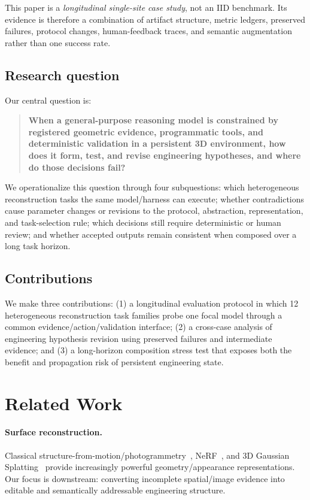 \documentclass[10pt]{article}
\begin{document}
This paper is a \emph{longitudinal single-site case study}, not an IID benchmark. Its evidence is therefore a combination of artifact structure, metric ledgers, preserved failures, protocol changes, human-feedback traces, and semantic augmentation rather than one success rate.

\subsection{Research question}
Our central question is:
\begin{quote}
\textbf{When a general-purpose reasoning model is constrained by registered geometric evidence, programmatic tools, and deterministic validation in a persistent 3D environment, how does it form, test, and revise engineering hypotheses, and where do those decisions fail?}
\end{quote}
We operationalize this question through four subquestions: which heterogeneous reconstruction tasks the same model/harness can execute; whether contradictions cause parameter changes or revisions to the protocol, abstraction, representation, and task-selection rule; which decisions still require deterministic or human review; and whether accepted outputs remain consistent when composed over a long task horizon.

\subsection{Contributions}
We make three contributions: (1) a longitudinal evaluation protocol in which 12 heterogeneous reconstruction task families probe one focal model through a common evidence/action/validation interface; (2) a cross-case analysis of engineering hypothesis revision using preserved failures and intermediate evidence; and (3) a long-horizon composition stress test that exposes both the benefit and propagation risk of persistent engineering state.

\section{Related Work}
\paragraph{Surface reconstruction.} Classical structure-from-motion/photogrammetry~\cite{schonberger2016sfm}, NeRF~\cite{mildenhall2020nerf}, and 3D Gaussian Splatting~\cite{kerbl2023gaussians} provide increasingly powerful geometry/appearance representations. Our focus is downstream: converting incomplete spatial/image evidence into editable and semantically addressable engineering structure.
\end{document}
